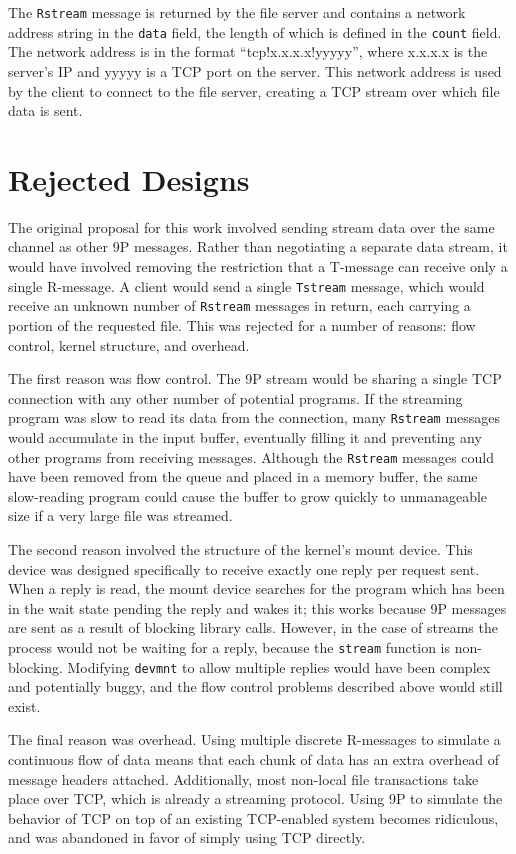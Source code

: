 \documentclass[11pt,american]{report}
\begin{document}
The {\tt Rstream} message is returned by the file server and contains a network address string in the {\tt data} field, the length of which is defined in the {\tt count} field. The network address is in the format ``tcp!x.x.x.x!yyyyy'', where x.x.x.x is the server's IP and yyyyy is a TCP port on the server. This network address is used by the client to connect to the file server, creating a TCP stream over which file data is sent.

\section{Rejected Designs}

The original proposal for this work involved sending stream data over the same channel as other 9P messages. Rather than negotiating a separate data stream, it would have involved removing the restriction that a T-message can receive only a single R-message. A client would send a single {\tt Tstream} message, which would receive an unknown number of {\tt Rstream} messages in return, each carrying a portion of the requested file. This was rejected for a number of reasons: flow control, kernel structure, and overhead.

The first reason was flow control. The 9P stream would be sharing a single TCP connection with any other number of potential programs. If the streaming program was slow to read its data from the connection, many {\tt Rstream} messages would accumulate in the input buffer, eventually filling it and preventing any other programs from receiving messages. Although the {\tt Rstream} messages could have been removed from the queue and placed in a memory buffer, the same slow-reading program could cause the buffer to grow quickly to unmanageable size if a very large file was streamed.

The second reason involved the structure of the kernel's mount device. This device was designed specifically to receive exactly one reply per request sent. When a reply is read, the mount device searches for the program which has been in the wait state pending the reply and wakes it; this works because 9P messages are sent as a result of blocking library calls. However, in the case of streams the process would not be waiting for a reply, because the {\tt stream} function is non-blocking. Modifying {\tt devmnt} to allow multiple replies would have been complex and potentially buggy, and the flow control problems described above would still exist.

The final reason was overhead. Using multiple discrete R-messages to simulate a continuous flow of data means that each chunk of data has an extra overhead of message headers attached. Additionally, most non-local file transactions take place over TCP, which is already a streaming protocol. Using 9P to simulate the behavior of TCP on top of an existing TCP-enabled system becomes ridiculous, and was abandoned in favor of simply using TCP directly.
\end{document}
